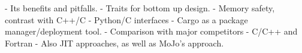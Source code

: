 

- Its benefits and pitfalls.
- Traits for bottom up design.
- Memory safety, contrast with C++/C
- Python/C interfaces
- Cargo as a package manager/deployment tool.
- Comparison with major competitors
- C/C++ and Fortran
- Also JIT approaches, as well as MoJo's approach.